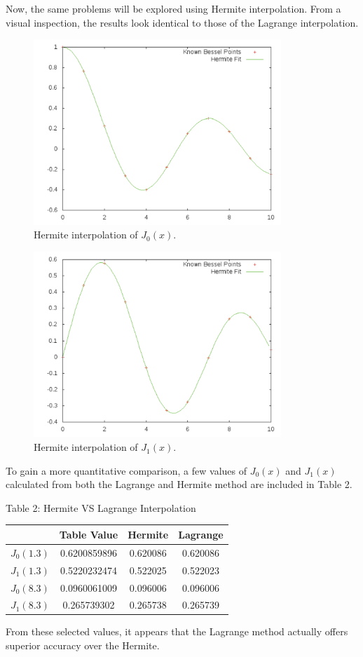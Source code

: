 \documentclass[12pt]{article}
\begin{document}
Now, the same problems will be explored using Hermite interpolation.  From a visual inspection, the results look identical to those of the Lagrange interpolation.
\begin{figure}[!h]
\centering
\includegraphics[width =120 mm, height = 70mm]{Ex_3_4_j0.pdf}
\caption{Hermite interpolation of $J_0(x)$.}
\label{fig:3.3.j0}
\end{figure}
\begin{figure}[!h]
\centering
\includegraphics[width =120 mm, height = 70mm]{Ex_3_4_j1.pdf}
\caption{Hermite interpolation of $J_1(x)$.}
\label{fig:3.3.j1}
\end{figure}
To gain a more quantitative comparison, a few values of $J_0(x)$ and $J_1(x)$ calculated from both the Lagrange and Hermite method are included in Table 2.
\begin{center}
Table 2:  Hermite VS Lagrange Interpolation \\
\begin{tabular}{ | c | c | c | c |}
\hline
 & Table Value & Hermite & Lagrange  \\ \hline
$J_0(1.3)$ & 0.6200859896 & 0.620086 & 0.620086 \\ \hline
$J_1(1.3)$ & 0.5220232474 & 0.522025 & 0.522023 \\ \hline
$J_0(8.3)$ & 0.0960061009 & 0.096006 & 0.096006 \\ \hline
$J_1(8.3)$ & 0.265739302 & 0.265738 & 0.265739 \\ \hline
\end{tabular}
\end{center}
From these selected values, it appears that the Lagrange method actually offers superior accuracy over the Hermite.  
\end{document}
